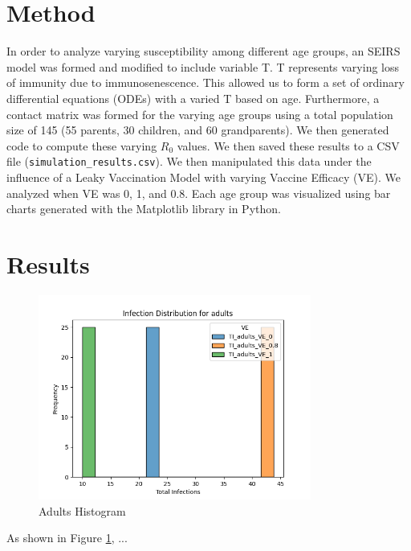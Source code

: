 \documentclass{article}
\begin{document}
\section{Method}
In order to analyze varying susceptibility among different age groups, an SEIRS model was formed and modified to include variable T. T represents varying loss of immunity due to immunosenescence. This allowed us to form a set of ordinary differential equations (ODEs) with a varied T based on age. Furthermore, a contact matrix was formed for the varying age groups using a total population size of 145 (55 parents, 30 children, and 60 grandparents). We then generated code to compute these varying $R_0$ values. We then saved these results to a CSV file (\texttt{simulation\_results.csv}). We then manipulated this data under the influence of a Leaky Vaccination Model with varying Vaccine Efficacy (VE). We analyzed when VE was 0, 1, and 0.8. Each age group was visualized using bar charts generated with the Matplotlib library in Python.

\section{Results}

\begin{figure}[htbp]
    \centering
    \includegraphics[width=0.8\textwidth]{adults}
    \caption{Adults Histogram}
    \label{fig:adults} %
\end{figure}

As shown in Figure \ref{fig:adults}, ...
\end{document}
